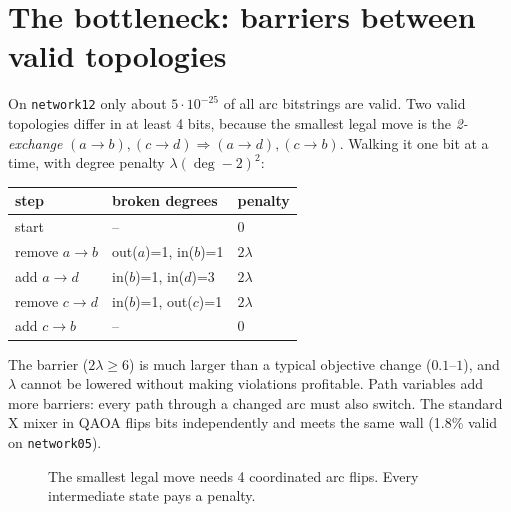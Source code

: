 \documentclass[11pt]{article}
\begin{document}
\section{The bottleneck: barriers between valid topologies}
On \texttt{network12} only about $5\cdot10^{-25}$ of all arc bitstrings are valid. Two
valid topologies differ in at least 4 bits, because the smallest legal move is the
\emph{2-exchange} $(a\!\to\!b),(c\!\to\!d)\Rightarrow(a\!\to\!d),(c\!\to\!b)$. Walking it one
bit at a time, with degree penalty $\lambda(\deg-2)^2$:
\begin{center}
\begin{tabular}{@{}lll@{}}
\toprule
step & broken degrees & penalty\\
\midrule
start & -- & 0\\
remove $a\to b$ & out($a$)=1, in($b$)=1 & $2\lambda$\\
add $a\to d$ & in($b$)=1, in($d$)=3 & $2\lambda$\\
remove $c\to d$ & in($b$)=1, out($c$)=1 & $2\lambda$\\
add $c\to b$ & -- & 0\\
\bottomrule
\end{tabular}
\end{center}
The barrier ($2\lambda\ge 6$) is much larger than a typical objective change ($0.1$--$1$),
and $\lambda$ cannot be lowered without making violations profitable. Path variables add
more barriers: every path through a changed arc must also switch. The standard X mixer in
QAOA flips bits independently and meets the same wall (1.8\% valid on \texttt{network05}).

\begin{figure}[h]
\centering
{}
\caption{The smallest legal move needs 4 coordinated arc flips. Every intermediate state
pays a penalty.}
\end{figure}
\end{document}
